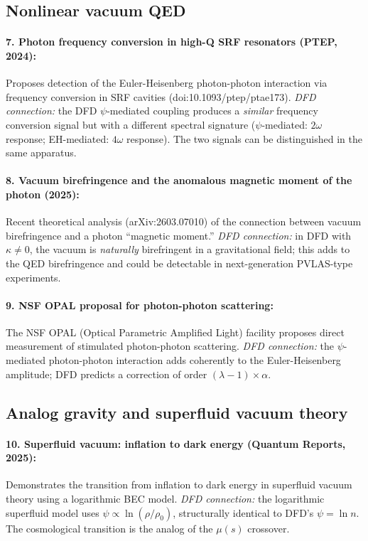 \documentclass[aps,prd,twocolumn,superscriptaddress,nofootinbib]{revtex4-2}
\begin{document}
\subsection{Nonlinear vacuum QED}

\paragraph{7. Photon frequency conversion in high-Q SRF resonators
(PTEP, 2024):}
Proposes detection of the Euler-Heisenberg photon-photon interaction
via frequency conversion in SRF cavities (doi:10.1093/ptep/ptae173).
\emph{DFD connection:} the DFD $\psi$-mediated coupling produces a
\emph{similar} frequency conversion signal but with a different
spectral signature ($\psi$-mediated: $2\omega$ response; EH-mediated:
$4\omega$ response).  The two signals can be distinguished in the
same apparatus.

\paragraph{8. Vacuum birefringence and the anomalous magnetic moment
of the photon (2025):}
Recent theoretical analysis (arXiv:2603.07010) of the connection
between vacuum birefringence and a photon ``magnetic moment.''
\emph{DFD connection:} in DFD with $\kappa \neq 0$, the vacuum is
\emph{naturally} birefringent in a gravitational field; this adds to
the QED birefringence and could be detectable in next-generation
PVLAS-type experiments.

\paragraph{9. NSF OPAL proposal for photon-photon scattering:}
The NSF OPAL (Optical Parametric Amplified Light) facility proposes
direct measurement of stimulated photon-photon scattering.
\emph{DFD connection:} the $\psi$-mediated photon-photon interaction
adds coherently to the Euler-Heisenberg amplitude; DFD predicts
a correction of order $(\lambda - 1) \times \alpha$.

\subsection{Analog gravity and superfluid vacuum theory}

\paragraph{10. Superfluid vacuum: inflation to dark energy (Quantum
Reports, 2025):}
Demonstrates the transition from inflation to dark energy in
superfluid vacuum theory using a logarithmic BEC model.
\emph{DFD connection:} the logarithmic superfluid model uses
$\psi \propto \ln(\rho/\rho_0)$, structurally identical to DFD's
$\psi = \ln n$.  The cosmological transition is the analog of the
$\mu(s)$ crossover.
\end{document}
